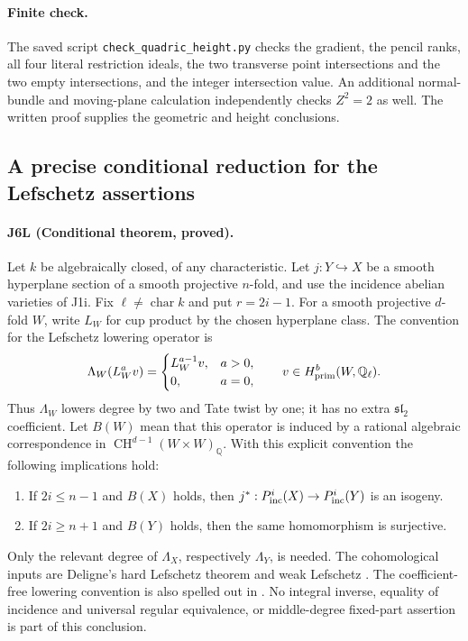 \paragraph{Finite check.}
The saved script \texttt{check\_quadric\_height.py} checks the
gradient, the pencil ranks, all four literal restriction ideals,
the two transverse point intersections and the two empty intersections,
and the integer intersection value. An additional normal-bundle and
moving-plane calculation independently checks $Z^2=2$ as well.
The written proof supplies the geometric and height conclusions.


\subsection{A precise conditional reduction for the Lefschetz assertions}
\paragraph{J6L (Conditional theorem, proved).}
Let $k$ be algebraically closed, of any characteristic. Let
$j:Y\hookrightarrow X$ be a smooth hyperplane section of a smooth
projective $n$-fold, and use the incidence abelian varieties of J1i.
Fix $\ell\ne\operatorname{char}k$ and put $r=2i-1$. For a smooth
projective $d$-fold $W$, write $L_W$ for cup product by the chosen
hyperplane class. The convention for the Lefschetz lowering
operator is
\[
 \Lambda_W(L_W^a v)=
 \begin{cases}L_W^{a-1}v,&a>0,\\0,&a=0,\end{cases}
 \qquad v\in H^b_{\rm prim}(W,\mathbb Q_\ell).
\]
Thus $\Lambda_W$ lowers degree by two and Tate twist by one; it
has no extra $\mathfrak{sl}_2$ coefficient. Let $B(W)$ mean that
this operator is induced by a rational algebraic correspondence
in $\operatorname{CH}^{d-1}(W\times W)_{\mathbb Q}$.
With this explicit convention the following implications hold:
\begin{enumerate}
\item If $2i\leq n-1$ and $B(X)$ holds, then
$j^*:P^i_{\rm inc}(X)\to P^i_{\rm inc}(Y)$ is an isogeny.
\item If $2i\geq n+1$ and $B(Y)$ holds, then the same homomorphism
is surjective.
\end{enumerate}
Only the relevant degree of $\Lambda_X$, respectively
$\Lambda_Y$, is needed. The cohomological inputs are Deligne's hard Lefschetz theorem
\cite[Theorem 4.1.1, p.~217]{DGJ_Deligne1980} and weak
Lefschetz \cite[(4.1.6), pp.~218--219]{DGJ_Deligne1980}.
The coefficient-free lowering convention is also spelled out in
\cite[Section 4.1, pp.~6--7]{DGJ_Peters2026}.
No integral inverse, equality of
incidence and universal regular equivalence, or middle-degree
fixed-part assertion is part of this conclusion.

